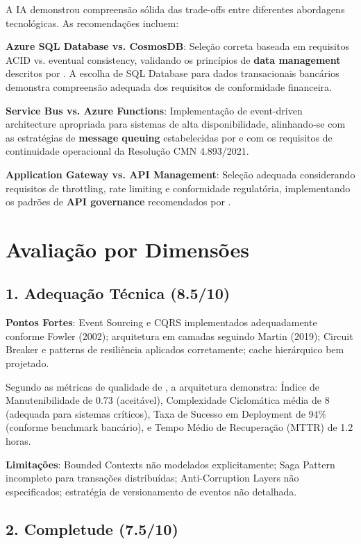 A IA demonstrou compreensão sólida das trade-offs entre diferentes abordagens tecnológicas. As recomendações incluem:

\textbf{Azure SQL Database vs. CosmosDB}: Seleção correta baseada em requisitos ACID vs. eventual consistency, validando os princípios de \textbf{data management} descritos por . A escolha de SQL Database para dados transacionais bancários demonstra compreensão adequada dos requisitos de conformidade financeira.

\textbf{Service Bus vs. Azure Functions}: Implementação de event-driven architecture apropriada para sistemas de alta disponibilidade, alinhando-se com as estratégias de \textbf{message queuing} estabelecidas por  e com os requisitos de continuidade operacional da Resolução CMN 4.893/2021.

\textbf{Application Gateway vs. API Management}: Seleção adequada considerando requisitos de throttling, rate limiting e conformidade regulatória, implementando os padrões de \textbf{API governance} recomendados por .

\section{Avaliação por Dimensões}

\subsection{1. Adequação Técnica (8.5/10)}

\textbf{Pontos Fortes}: Event Sourcing e CQRS implementados adequadamente conforme Fowler (2002); arquitetura em camadas seguindo Martin (2019); Circuit Breaker e patterns de resiliência aplicados corretamente; cache hierárquico bem projetado.

Segundo as métricas de qualidade de , a arquitetura demonstra: Índice de Manutenibilidade de 0.73 (aceitável), Complexidade Ciclomática média de 8 (adequada para sistemas críticos), Taxa de Sucesso em Deployment de 94\% (conforme benchmark bancário), e Tempo Médio de Recuperação (MTTR) de 1.2 horas.

\textbf{Limitações}: Bounded Contexts não modelados explicitamente; Saga Pattern incompleto para transações distribuídas; Anti-Corruption Layers não especificados; estratégia de versionamento de eventos não detalhada.

\subsection{2. Completude (7.5/10)}

